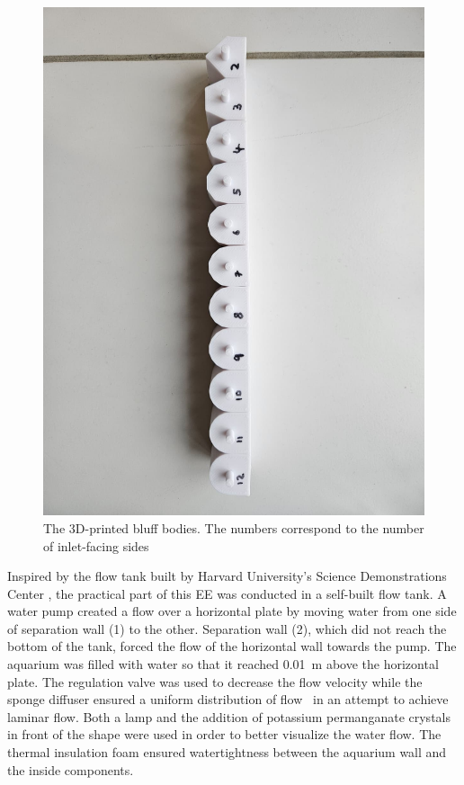 \begin{figure}[H]
	\centering
	\includegraphics[width=\textwidth]{images/shapes.jpg}
	\caption{The 3D-printed bluff bodies. The numbers correspond to the number of inlet-facing sides}
	\label{fig:shapes}
\end{figure}

\newpage

Inspired by the flow tank built by Harvard University’s Science Demonstrations Center \parencite{noauthor_vortex_nodate}, the practical part of this EE was conducted in a self-built flow tank. A water pump created a flow over a horizontal plate by moving water from one side of separation wall (1) to the other. Separation wall (2), which did not reach the bottom of the tank, forced the flow of the horizontal wall towards the pump. The aquarium was filled with water so that it reached \SI{0.01}{\meter} above the horizontal plate. The regulation valve was used to decrease the flow velocity while the sponge diffuser ensured a uniform distribution of flow \textemdash\ in an attempt to achieve laminar flow. Both a lamp and the addition of potassium permanganate crystals in front of the shape were used in order to better visualize the water flow. The thermal insulation foam ensured watertightness between the aquarium wall and the inside components. 

